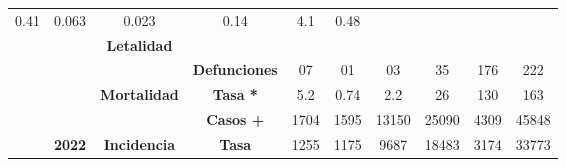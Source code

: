 \begin{tabular}{lccc|cccccc|}
		\multicolumn{1}{c|}{\cellcolor[HTML]{E2EFDA}0.41} &
		\multicolumn{1}{c|}{\cellcolor[HTML]{E2EFDA}0.063} &
		\multicolumn{1}{c|}{\cellcolor[HTML]{E2EFDA}0.023} &
		\multicolumn{1}{c|}{\cellcolor[HTML]{E2EFDA}0.14} &
		\multicolumn{1}{c|}{\cellcolor[HTML]{E2EFDA}4.1} &
		\cellcolor[HTML]{E2EFDA}0.48 \\ \cline{4-10} 
		\multicolumn{1}{l|}{} &
		\multicolumn{1}{c|}{\cellcolor[HTML]{E2EFDA}} &
		\multicolumn{1}{c|}{\multirow{-2}{*}{\cellcolor[HTML]{E2EFDA}\textbf{Letalidad}}} &
		\cellcolor[HTML]{E2EFDA} &
		\multicolumn{1}{c|}{\cellcolor[HTML]{E2EFDA}} &
		\multicolumn{1}{c|}{\cellcolor[HTML]{E2EFDA}} &
		\multicolumn{1}{c|}{\cellcolor[HTML]{E2EFDA}} &
		\multicolumn{1}{c|}{\cellcolor[HTML]{E2EFDA}} &
		\multicolumn{1}{c|}{\cellcolor[HTML]{E2EFDA}} &
		\cellcolor[HTML]{E2EFDA} \\ \cline{3-3}
		\multicolumn{1}{l|}{} &
		\multicolumn{1}{c|}{\cellcolor[HTML]{E2EFDA}} &
		\multicolumn{1}{c|}{\cellcolor[HTML]{E2EFDA}} &
		\multirow{-2}{*}{\cellcolor[HTML]{E2EFDA}\textbf{Defunciones}} &
		\multicolumn{1}{c|}{\multirow{-2}{*}{\cellcolor[HTML]{E2EFDA}07}} &
		\multicolumn{1}{c|}{\multirow{-2}{*}{\cellcolor[HTML]{E2EFDA}01}} &
		\multicolumn{1}{c|}{\multirow{-2}{*}{\cellcolor[HTML]{E2EFDA}03}} &
		\multicolumn{1}{c|}{\multirow{-2}{*}{\cellcolor[HTML]{E2EFDA}35}} &
		\multicolumn{1}{c|}{\multirow{-2}{*}{\cellcolor[HTML]{E2EFDA}176}} &
		\multirow{-2}{*}{\cellcolor[HTML]{E2EFDA}222} \\ \cline{4-10} 
		\multicolumn{1}{l|}{} &
		\multicolumn{1}{c|}{\cellcolor[HTML]{E2EFDA}} &
		\multicolumn{1}{c|}{\multirow{-2}{*}{\cellcolor[HTML]{E2EFDA}\textbf{Mortalidad}}} &
		\cellcolor[HTML]{E2EFDA}\textbf{Tasa *} &
		\multicolumn{1}{c|}{\cellcolor[HTML]{E2EFDA}5.2} &
		\multicolumn{1}{c|}{\cellcolor[HTML]{E2EFDA}0.74} &
		\multicolumn{1}{c|}{\cellcolor[HTML]{E2EFDA}2.2} &
		\multicolumn{1}{c|}{\cellcolor[HTML]{E2EFDA}26} &
		\multicolumn{1}{c|}{\cellcolor[HTML]{E2EFDA}130} &
		\cellcolor[HTML]{E2EFDA}163 \\ \cline{3-10} 
		\multicolumn{1}{l|}{} &
		\multicolumn{1}{c|}{\cellcolor[HTML]{E2EFDA}} &     
		\multicolumn{1}{c|}{\cellcolor[HTML]{E2EFDA}} &
		\cellcolor[HTML]{E2EFDA}\textbf{Casos +} &
		\multicolumn{1}{c|}{\cellcolor[HTML]{E2EFDA}1704} &
		\multicolumn{1}{c|}{\cellcolor[HTML]{E2EFDA}1595} &
		\multicolumn{1}{c|}{\cellcolor[HTML]{E2EFDA}13150} &
		\multicolumn{1}{c|}{\cellcolor[HTML]{E2EFDA}25090} &
		\multicolumn{1}{c|}{\cellcolor[HTML]{E2EFDA}4309} &
		\cellcolor[HTML]{E2EFDA}45848 \\ \cline{4-10} 
		\multicolumn{1}{l|}{} &
		\multicolumn{1}{c|}{\multirow{-6}{*}{\cellcolor[HTML]{E2EFDA}\textbf{2022}}} &
		\multicolumn{1}{c|}{\multirow{-2}{*}{\cellcolor[HTML]{E2EFDA}\textbf{Incidencia}}} &
		\cellcolor[HTML]{E2EFDA}\textbf{Tasa} &
		\multicolumn{1}{c|}{\cellcolor[HTML]{E2EFDA}1255} &
		\multicolumn{1}{c|}{\cellcolor[HTML]{E2EFDA}1175} &
		\multicolumn{1}{c|}{\cellcolor[HTML]{E2EFDA}9687} &
		\multicolumn{1}{c|}{\cellcolor[HTML]{E2EFDA}18483} &
		\multicolumn{1}{c|}{\cellcolor[HTML]{E2EFDA}3174} &
		\cellcolor[HTML]{E2EFDA}33773 \\ \cline{2-10} 
	\end{tabular}
